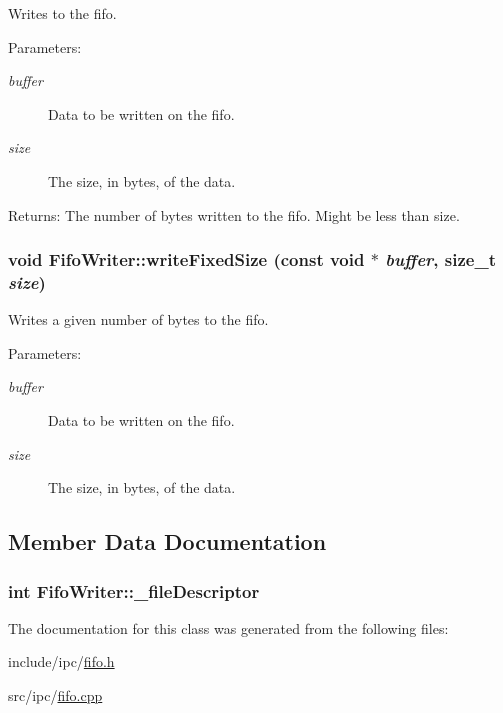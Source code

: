 Writes to the fifo.

\begin{Desc}
\item[Parameters:]
\begin{description}
\item[{\em buffer}]Data to be written on the fifo. \item[{\em size}]The size, in bytes, of the data. \end{description}
\end{Desc}
\begin{Desc}
\item[Returns:]The number of bytes written to the fifo. Might be less than size. \end{Desc}
\hypertarget{classFifoWriter_1edb004e8b962aa5704f3a5a277cc937}{
\subsubsection[{writeFixedSize}]{\setlength{\rightskip}{0pt plus 5cm}void FifoWriter::writeFixedSize (const void $\ast$ {\em buffer}, \/  size\_\-t {\em size})}}
\label{classFifoWriter_1edb004e8b962aa5704f3a5a277cc937}


Writes a given number of bytes to the fifo.

\begin{Desc}
\item[Parameters:]
\begin{description}
\item[{\em buffer}]Data to be written on the fifo. \item[{\em size}]The size, in bytes, of the data. \end{description}
\end{Desc}


\subsection{Member Data Documentation}
\hypertarget{classFifoWriter_42cafef03b8826bf3fe2d291d6ef86f4}{
\subsubsection[{\_\-fileDescriptor}]{\setlength{\rightskip}{0pt plus 5cm}int {\bf FifoWriter::\_\-fileDescriptor}}}
\label{classFifoWriter_42cafef03b8826bf3fe2d291d6ef86f4}




The documentation for this class was generated from the following files:\begin{CompactItemize}
\item 
include/ipc/\hyperlink{fifo_8h}{fifo.h}\item 
src/ipc/\hyperlink{fifo_8cpp}{fifo.cpp}\end{CompactItemize}
